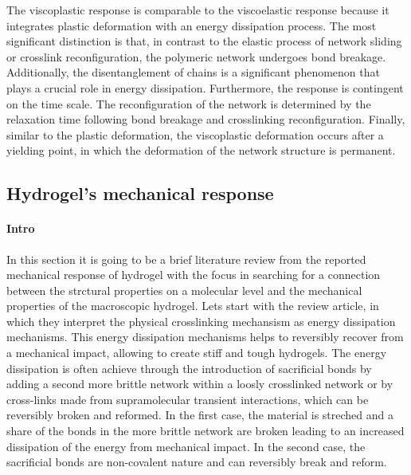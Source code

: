The viscoplastic response is comparable to the viscoelastic response because it integrates plastic deformation with an energy dissipation process.
The most significant distinction is that, in contrast to the elastic process of network sliding or crosslink reconfiguration, the polymeric network undergoes bond breakage.
Additionally, the disentanglement of chains is a significant phenomenon that plays a crucial role in energy dissipation.
Furthermore, the response is contingent on the time scale. 
The reconfiguration of the network is determined by the relaxation time following bond breakage and crosslinking reconfiguration.
Finally, similar to the plastic deformation, the viscoplastic deformation occurs after a yielding point, in which the deformation of the network structure is permanent.

\subsection{Hydrogel's mechanical response}


\paragraph{Intro}
In this section it is going to be a brief literature review from the reported mechanical response of hydrogel with the focus in searching for a connection between the strctural properties on a molecular level and the mechanical properties of the macroscopic hydrogel.
Lets start with the review article\citep{petelinsekToughHydrogelsLoadBearing2024}, in which they interpret the physical crosslinking mechansism as energy dissipation mechanisms.
This energy dissipation mechanisms helps to reversibly recover from a mechanical impact, allowing to create stiff and tough hydrogels.
The energy dissipation is often achieve through the introduction of sacrificial bonds by adding a second more brittle network within a loosly crosslinked network or by cross-links made from supramolecular transient interactions, which can be reversibly broken and reformed.
In the first case, the material is streched and a share of the bonds in the more brittle network are broken leading to an increased dissipation of the energy from mechanical impact.
In the second case, the sacrificial bonds are non-covalent nature and can reversibly break and reform.

